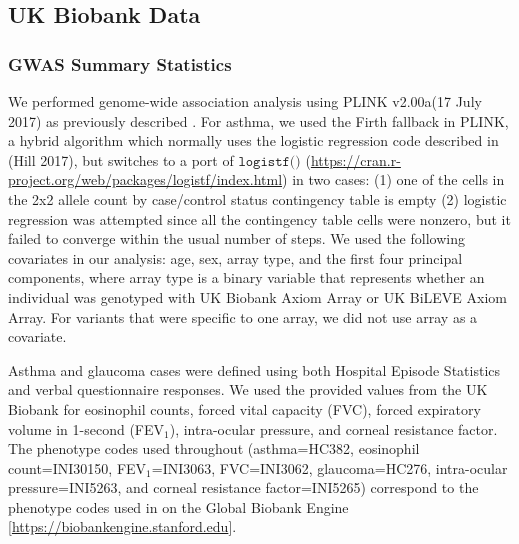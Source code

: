 \subsection*{UK Biobank Data}
\subsubsection*{GWAS Summary Statistics}
We performed genome-wide association analysis using PLINK v2.00a(17 July 2017) as previously described \cite{DeBoever179762}. For asthma, we used the Firth fallback in PLINK, a hybrid algorithm which normally uses the logistic regression code described in (Hill 2017), but switches to a port of $\texttt{logistf()}$ (\url{https://cran.r-project.org/web/packages/logistf/index.html}) in two cases: (1) one of the cells in the 2x2 allele count by case/control status contingency table is empty (2) logistic regression was attempted since all the contingency table cells were nonzero, but it failed to converge within the usual number of steps. We used the following covariates in our analysis: age, sex, array type, and the first four principal components, where array type is a binary variable that represents whether an individual was genotyped with UK Biobank Axiom Array or UK BiLEVE Axiom Array. For variants that were specific to one array, we did not use array as a covariate. 

Asthma and glaucoma cases were defined using both Hospital Episode Statistics and verbal questionnaire responses. We used the provided values from the UK Biobank for eosinophil counts, forced vital capacity (FVC), forced expiratory volume in 1-second (FEV$_1$), intra-ocular pressure, and corneal resistance factor. The phenotype codes used throughout (asthma=HC382, eosinophil count=INI30150, FEV$_1$=INI3063, FVC=INI3062, glaucoma=HC276, intra-ocular pressure=INI5263, and corneal resistance factor=INI5265) correspond to the phenotype codes used in on the Global Biobank Engine [\url{https://biobankengine.stanford.edu}].


